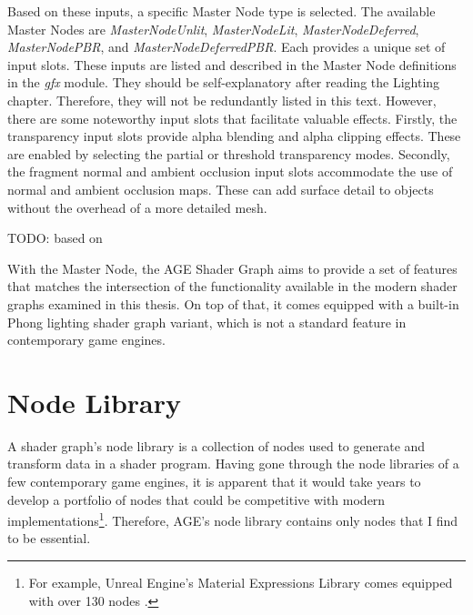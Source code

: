 \documentclass[
  digital,     %
  oneside,     %
  nosansbold,  %
  nocolorbold, %
  lof,         %
  lot,         %
]{fithesis4}
\begin{document}
Based on these inputs, a specific Master Node type is selected. The available Master Nodes are
\textit{MasterNodeUnlit}, \textit{MasterNodeLit}, \textit{MasterNodeDeferred}, \textit{MasterNodePBR},
and \textit{MasterNodeDeferredPBR}. Each provides a unique set of input slots.
These inputs are listed and described in the Master Node definitions in the \textit{gfx} module.
They should be self-explanatory after reading the Lighting chapter.
Therefore, they will not be redundantly listed in this text.
However, there are some noteworthy input slots that facilitate valuable effects.
Firstly, the transparency input slots provide alpha blending and alpha clipping effects.
These are enabled by selecting the partial or threshold transparency modes.
Secondly, the fragment normal and ambient occlusion input slots accommodate the use of normal and ambient occlusion maps.
These can add surface detail to objects without the overhead of a more detailed mesh.

TODO: based on \cite{ue-real-shading}


With the Master Node, the AGE Shader Graph aims to provide a set of features
that matches the intersection of the functionality available in the modern shader graphs examined in this thesis.
On top of that, it comes equipped with a built-in Phong lighting shader graph variant, which
is not a standard feature in contemporary game engines.

\section{Node Library}
A shader graph's node library is a collection of nodes used to generate and transform
data in a shader program. Having gone through the node libraries of a few contemporary game engines,
it is apparent that it would take years to develop a portfolio of nodes that could be competitive
with modern implementations\footnote{For example, Unreal Engine's Material Expressions Library comes equipped
with over 130 nodes \cite{ue-expr-reference}.}.
Therefore, AGE's node library contains only nodes that I find to be essential.
\end{document}
